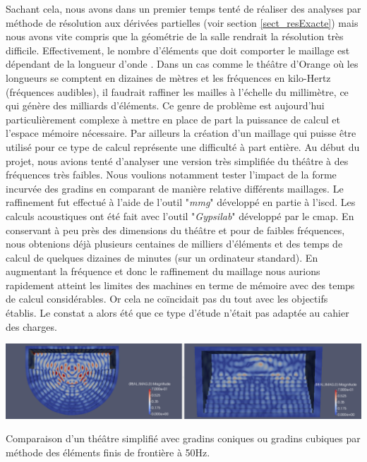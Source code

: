 Sachant cela, nous avons dans un premier temps tenté de réaliser des analyses par méthode de résolution aux dérivées partielles (voir section \ref{sect_resExacte}) mais nous avons vite compris que la géométrie de la salle rendrait la résolution très difficile. Effectivement, le nombre d'éléments que doit comporter le maillage est dépendant de la longueur d'onde \cite[p. 740]{beamtracing}. Dans un cas comme le théâtre d'Orange où les longueurs se comptent en dizaines de mètres et les fréquences en kilo-Hertz (fréquences audibles), il faudrait raffiner les mailles à l'échelle du millimètre, ce qui génère des milliards d'éléments. Ce genre de problème est aujourd'hui particulièrement complexe à mettre en place de part la puissance de calcul et l'espace mémoire nécessaire. Par ailleurs la création d'un maillage qui puisse être utilisé pour ce type de calcul représente une difficulté à part entière. Au début du projet, nous avions tenté d'analyser une version très simplifiée du théâtre à des fréquences très faibles. Nous voulions notamment tester l'impact de la forme incurvée des gradins en comparant de manière relative différents maillages. Le raffinement fut effectué à l'aide de l'outil "\textit{mmg}" \cite[github]{mmg} développé en partie à l'\gls{iscd}. Les calculs acoustiques ont été fait avec l'outil "\textit{Gypsilab}" \cite[github]{gypsilab} développé par le \gls{cmap}. En conservant à peu près des dimensions du théâtre et pour de faibles fréquences, nous obtenions déjà plusieurs centaines de milliers d'éléments et des temps de calcul de quelques dizaines de minutes (sur un ordinateur standard). En augmentant la fréquence et donc le raffinement du maillage nous aurions rapidement atteint les limites des machines en terme de mémoire avec des temps de calcul considérables. Or cela ne coïncidait pas du tout avec les objectifs établis. Le constat a alors été que ce type d'étude n'était pas adaptée au cahier des charges.

\begin{figureth}
	\includegraphics[width=\linewidth]{images/BEM}
	\caption{Comparaison d'un théâtre simplifié avec gradins coniques ou gradins cubiques par méthode des éléments finis de frontière à 50Hz.}
	\label{BEM}
\end{figureth}

